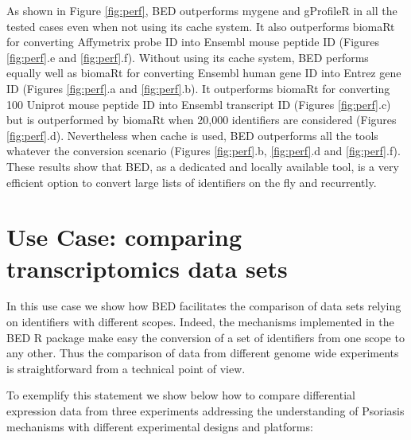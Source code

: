 \documentclass[9pt,a4paper,]{extarticle}
\theoremstyle{definition}
\theoremstyle{definition}
\theoremstyle{definition}
\theoremstyle{remark}
\begin{document}
As shown in Figure \ref{fig:perf},
BED outperforms mygene and gProfileR in all the tested cases even when not
using its cache system.
It also outperforms biomaRt for converting Affymetrix probe ID into Ensembl
mouse peptide ID (Figures \ref{fig:perf}.e and \ref{fig:perf}.f).
Without using its cache system, BED performs equally well as biomaRt for
converting Ensembl human gene ID into Entrez gene ID
(Figures \ref{fig:perf}.a and \ref{fig:perf}.b).
It outperforms biomaRt for converting 100 Uniprot mouse peptide ID
into Ensembl transcript ID (Figures \ref{fig:perf}.c)
but is outperformed by biomaRt when 20,000
identifiers are considered (Figures \ref{fig:perf}.d).
Nevertheless when cache is used, BED outperforms all the tools whatever the
conversion scenario
(Figures \ref{fig:perf}.b, \ref{fig:perf}.d and \ref{fig:perf}.f).
These results show that BED, as a dedicated and locally available tool,
is a very efficient option to convert large lists of identifiers on the fly
and recurrently.

\section{Use Case: comparing transcriptomics data sets}\label{use-case-comparing-transcriptomics-data-sets}

In this use case we show how BED facilitates the comparison of
data sets relying on identifiers with different scopes.
Indeed, the mechanisms implemented in the BED R package make easy the
conversion of a set of identifiers from one scope to any other.
Thus the comparison of data from different genome wide experiments
is straightforward from a technical point of view.

To exemplify this statement we show below how to compare differential expression
data from three experiments addressing the understanding of Psoriasis mechanisms
with different experimental designs and platforms:
\end{document}
